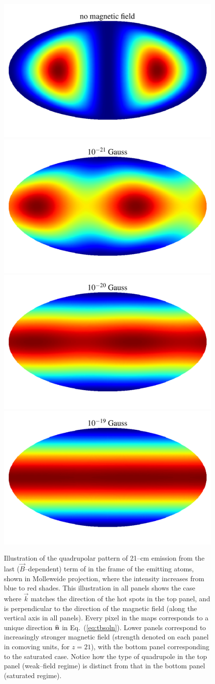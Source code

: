 \begin{figure}
\centering
\includegraphics[width=.4\textwidth,keepaspectratio=true]{hp_B_0e+00G.pdf}
\includegraphics[width=.4\textwidth,keepaspectratio=true]{hp_B_1e-18G.pdf}
\includegraphics[width=.4\textwidth,keepaspectratio=true]{hp_B_1e-17G.pdf}
\includegraphics[width=.4\textwidth,keepaspectratio=true]{hp_B_1e-16G.pdf}
\caption{Illustration of the quadrupolar pattern of 21--cm emission from the last ($\vec B$--dependent) term of \eq{\ref{eq:tbsoln}} in the frame of the emitting atoms, shown in Molleweide projection, where the intensity increases from blue to red shades. This illustration in all panels shows the case where $\vec k$ matches the direction of the hot spots in the top panel, and is perpendicular to the direction of the magnetic field (along the vertical axis in all panels). Every pixel in the maps corresponds to a unique direction $\bf{\widehat n}$ in Eq.~(\ref{eq:tbsoln}). Lower panels correspond to increasingly stronger magnetic field (strength denoted on each panel in comoving units, for $z=21$), with the bottom panel corresponding to the saturated case. Notice how the type of quadrupole in the top panel (weak--field regime) is distinct from that in the bottom panel (saturated regime). \label{fig:hp}}
\end{figure}

